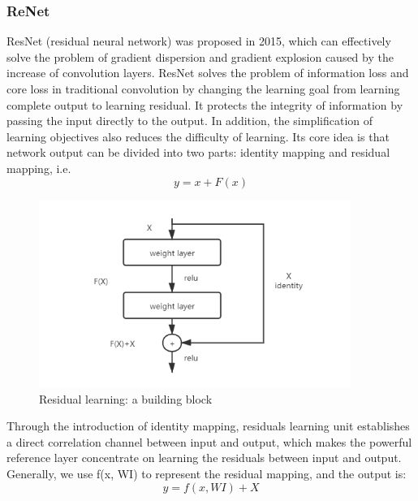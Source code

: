 \documentclass[runningheads]{llncs}
\begin{document}
\subsubsection{ReNet}
ResNet (residual neural network) was proposed in 2015, which can effectively solve the problem of gradient dispersion and gradient explosion caused by the increase of convolution layers. ResNet solves the problem of information loss and core loss in traditional convolution by changing the learning goal from learning complete output to learning residual. It protects the integrity of information by passing the input directly to the output. In addition, the simplification of learning objectives also reduces the difficulty of learning\cite{m3}. Its core idea is that network output can be divided into two parts: identity mapping and residual mapping, i.e. 
\begin{equation}
y = x + F(x)
\end{equation}

\begin{figure}
	\centering
	\includegraphics[width=4.0in]{figures/p2.png}
	\caption{Residual learning: a building block}
\end{figure}

Through the introduction of identity mapping, residuals learning unit establishes a direct correlation channel between input and output, which makes the powerful reference layer concentrate on learning the residuals between input and output. Generally, we use f(x, WI) to represent the residual mapping, and the output is: 
\begin{equation}
y = f(x, WI) + X
\end{equation}
\end{document}
